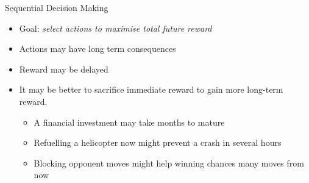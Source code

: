 \bgroup
\begin{frame}{Sequential Decision Making}
\begin{itemize}
\item Goal: \emph{select actions to maximise total future reward}
\item Actions may have long term consequences
\item Reward may be delayed
\item It may be better to sacrifice immediate reward to gain more long-term reward.
\begin{itemize}
\item A financial investment may take months to mature
\item Refuelling a helicopter now might prevent a crash in several hours
\item Blocking opponent moves might help winning chances many moves from now
\end{itemize}
\end{itemize}
\end{frame}
\egroup